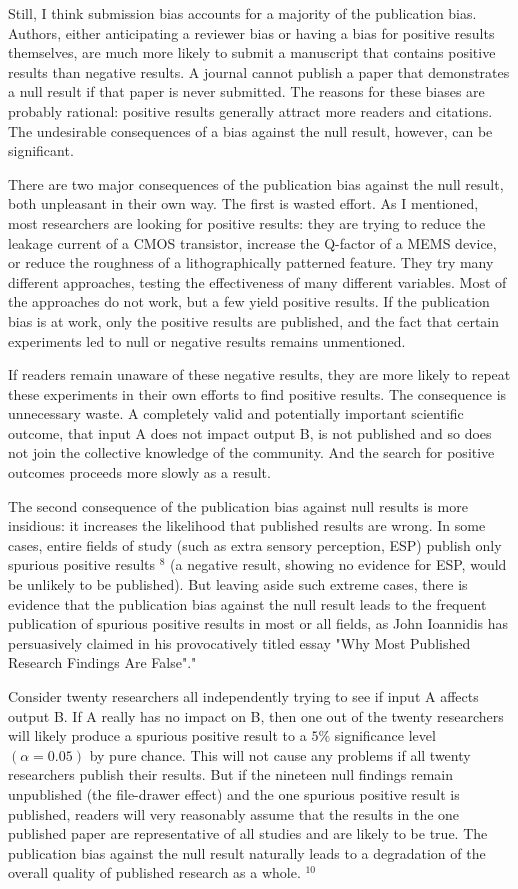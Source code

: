 Still, I think submission bias accounts for a majority of the publication bias. Authors, either anticipating a reviewer bias or having a bias for positive results themselves, are much more likely to submit a manuscript that contains positive results than negative results. A journal cannot publish a paper that demonstrates a null result if that paper is never submitted. The reasons for these biases are probably rational: positive results generally attract more readers and citations. The undesirable consequences of a bias against the null result, however, can be significant.

There are two major consequences of the publication bias against the null result, both unpleasant in their own way. The first is wasted effort. As I mentioned, most researchers are looking for positive results: they are trying to reduce the leakage current of a CMOS transistor, increase the Q-factor of a MEMS device, or reduce the roughness of a lithographically patterned feature. They try many different approaches, testing the effectiveness of many different variables. Most of the approaches do not work, but a few yield positive results. If the publication bias is at work, only the positive results are published, and the fact that certain experiments led to null or negative results remains unmentioned.

If readers remain unaware of these negative results, they are more likely to repeat these experiments in their own efforts to find positive results. The consequence is unnecessary waste. A completely valid and potentially important scientific outcome, that input A does not impact output B, is not published and so does not join the collective knowledge of the community. And the search for positive outcomes proceeds more slowly as a result.

The second consequence of the publication bias against null results is more insidious: it increases the likelihood that published results are wrong. In some cases, entire fields of study (such as extra sensory perception, ESP) publish only spurious positive results ${ }^{8}$ (a negative result, showing no evidence for ESP, would be unlikely to be published). But leaving aside such extreme cases, there is evidence that the publication bias against the null result leads to the frequent publication of spurious positive results in most or all fields, as John Ioannidis has persuasively claimed in his provocatively titled essay "Why Most Published Research Findings Are False"."

Consider twenty researchers all independently trying to see if input A affects output B. If A really has no impact on B, then one out of the twenty researchers will likely produce a spurious positive result to a $5 \%$ significance level $(\alpha=0.05)$ by pure chance. This will not cause any problems if all twenty researchers publish their results. But if the nineteen null findings remain unpublished (the file-drawer effect) and the one spurious positive result is published, readers will very reasonably assume that the results in the one published paper are representative of all studies and are likely to be true. The publication bias against the null result naturally leads to a degradation of the overall quality of published research as a whole. $^{10}$

